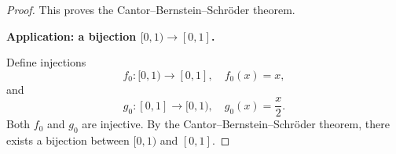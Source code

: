 \documentclass[answers,12pt,addpoints]{exam}
\begin{document}
\begin{proof}
This proves the Cantor--Bernstein--Schröder theorem.

\medskip

\noindent\textbf{Application: a bijection $[0,1) \to [0,1]$.}

Define injections
\[
f_0 : [0,1) \to [0,1], \quad f_0(x) = x,
\]
and
\[
g_0 : [0,1] \to [0,1), \quad g_0(x) = \frac{x}{2}.
\]
Both $f_0$ and $g_0$ are injective. By the Cantor--Bernstein--Schröder theorem,
there exists a bijection between $[0,1)$ and $[0,1]$.
\end{proof}
\end{document}
